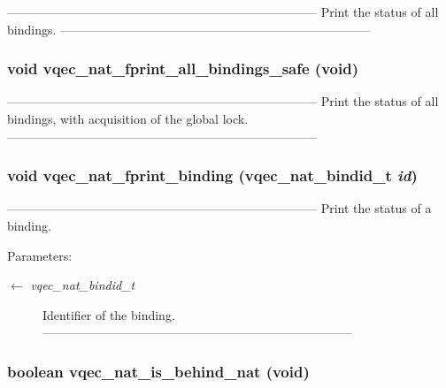 --------------------------------------------------------------------------- Print the status of all bindings. --------------------------------------------------------------------------- 
\subsubsection{\setlength{\rightskip}{0pt plus 5cm}void vqec\_\-nat\_\-fprint\_\-all\_\-bindings\_\-safe (void)}\label{vqec__nat__interface_8h_cc358fb4fc880240511b24b1003e9d10}


--------------------------------------------------------------------------- Print the status of all bindings, with acquisition of the global lock. --------------------------------------------------------------------------- 
\subsubsection{\setlength{\rightskip}{0pt plus 5cm}void vqec\_\-nat\_\-fprint\_\-binding (vqec\_\-nat\_\-bindid\_\-t {\em id})}\label{vqec__nat__interface_8h_09109143f3deb6fef2d3023a748f06c4}


--------------------------------------------------------------------------- Print the status of a binding.

\begin{Desc}
\item[Parameters:]
\begin{description}
\item[\mbox{$\leftarrow$} {\em vqec\_\-nat\_\-bindid\_\-t}]Identifier of the binding. --------------------------------------------------------------------------- \end{description}
\end{Desc}
\subsubsection{\setlength{\rightskip}{0pt plus 5cm}boolean vqec\_\-nat\_\-is\_\-behind\_\-nat (void)}\label{vqec__nat__interface_8h_fcb807b3a55de54bfa848411d6bb1c34}



